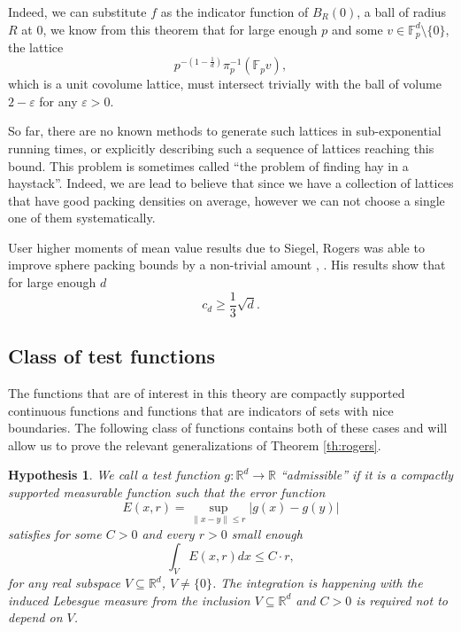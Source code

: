 \documentclass{amsart}
\newtheorem{hypothesis}[theorem]{Hypothesis}
\begin{document}
Indeed, we can substitute $f$ as the indicator function of $B_{R}(0)$, a ball of radius $R$ at $0$, we know from this theorem that for large enough $p$ and some $v \in \mathbb{F}_{p}^{d} \setminus \{ 0\}$, the lattice $$p^{-\left( 1 - \frac{1}{d} \right)} \pi_{p}^{-1} \left( \mathbb{F}_p v \right),$$ which is a unit covolume lattice, must intersect trivially with the ball of volume $2- \varepsilon$ for any $\varepsilon >0$. 

So far, there are no known methods to generate such lattices in sub-exponential running times, or explicitly describing such a sequence of lattices reaching this bound. This problem is sometimes called ``the problem of finding hay in a haystack''. Indeed, we are lead to believe that since we have a collection of lattices that have good packing densities on average, however we can not choose a single one of them systematically. 

User higher moments of mean value results due to Siegel, Rogers was able to improve sphere packing bounds by a non-trivial amount \cite{R1955}, \cite{R1956}. His results show that for large enough $d$
\begin{equation}
c_d \ge \frac{1}{3}\sqrt{d}.
\end{equation}
\fi

\subsection{Class of test functions}
  \label{se:test_funcs}

  The functions that are of interest in this theory are compactly supported continuous functions and functions that are indicators of sets with nice boundaries. The following class of functions contains both of these cases and will allow us to prove the relevant generalizations of Theorem \ref{th:rogers}.

  \begin{hypothesis} We call a test function
$g: \mathbb{R}^{d} \rightarrow \mathbb{R}$ 
``admissible'' if it is a 
compactly supported measurable function such that 
the error function 
\begin{equation}
  E(x,r) = \sup_{\|x-y\| \leq r} |g(x)-g(y)|
\end{equation}
satisfies for some $C>0$ and every $r>0$ small enough
\begin{equation}
  \int_{V} E(x,r) dx \leq C \cdot r,
\end{equation}
for any real subspace $V \subseteq \mathbb{R}^{d}$, $V \neq \{ 0 \}$. The integration is happening with the induced Lebesgue 
measure from the inclusion $V \subseteq \mathbb{R}^{d}$ and $C>0$ is required not to depend on $V$. 
\label{hy:admisible}
\end{hypothesis}
\end{document}

